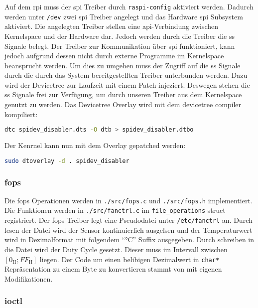 Auf dem \gls{rpi} muss der \gls{spi} Treiber durch \texttt{raspi-config} aktiviert werden.
Dadurch werden unter \texttt{/dev} zwei \gls{spi} Treiber angelegt und das Hardware \gls{spi} Subsystem aktiviert.
Die angelegten Treiber stellen eine \gls{api}-Verbindung zwischen Kernelspace und der Hardware dar.
Jedoch werden durch die Treiber die \gls{ss} Signale belegt.
Der Treiber zur Kommunikation über \gls{spi} funktioniert, kann jedoch aufgrund dessen nicht durch externe Programme im Kernelspace beansprucht werden.
Um dies zu umgehen muss der Zugriff auf die \gls{ss} Signale durch die durch das System bereitgestellten Treiber unterbunden werden.
Dazu wird der Devicetree zur Laufzeit mit einem Patch injeziert.
Deswegen stehen die \gls{ss} Signale frei zur Verfügung, um durch unseren Treiber aus dem Kernelspace genutzt zu werden.
Das Devicetree Overlay wird mit dem devicetree compiler kompiliert:
\begin{lstlisting}[language=bash, numbers=none]
dtc spidev_disabler.dts -O dtb > spidev_disabler.dtbo
\end{lstlisting}
\noindent
Der Kenrnel kann nun mit dem Overlay gepatched werden:
\begin{lstlisting}[language=bash, numbers=none]
sudo dtoverlay -d . spidev_disabler
\end{lstlisting}

\subsubsection{\acrshort{fops}}

Die \gls{fops} Operationen werden in \texttt{./src/fops.c} und \texttt{./src/fops.h} implementiert.
Die Funktionen werden in \texttt{./src/fanctrl.c} im \texttt{file\_operations} struct registriert.
Der \gls{fops} Treiber legt eine Pseudodatei unter \texttt{/etc/fanctrl} an.
Durch lesen der Datei wird der Sensor kontinuierlich ausgelsen und der Temperaturwert wird in Dezimalformat mit folgendem \enquote{\si{\celsius}} Suffix ausgegeben.
Durch schreiben in die Datei wird der Duty Cycle gesetzt.
Dieser muss im Intervall zwischen $\left[0_{\text{H}}; FF_{\text{H}}\right]$ liegen.
Der Code um einen belibigen Dezimalwert in \texttt{char*} Repräsentation zu einem Byte zu konvertieren stammt von \autocite{toUint} mit eigenen Modifikationen.

\subsubsection{\Acrshort{ioctl}}

